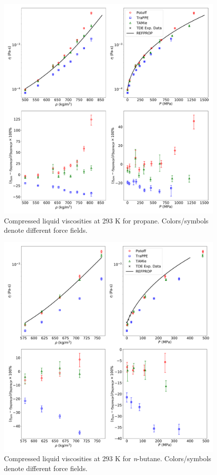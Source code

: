 \documentclass[preprint,review,12pt]{elsarticle}
\begin{document}
	\begin{figure}[htb!]
		\centering
		\includegraphics[width=6.4in]{compare_REFPROP_T293highP_C3H8_Pas.pdf}
		\caption{Compressed liquid viscosities at 293 K for propane. Colors/symbols denote different force fields.}
		\label{fig:T293highP_C3}
	\end{figure} 
	
	\begin{figure}[htb!]
		\centering
		\includegraphics[width=6.4in]{compare_REFPROP_T293highP_C4H10_Pas_new_REFPROP.pdf}
		\caption{Compressed liquid viscosities at 293 K for \textit{n}-butane. Colors/symbols denote different force fields.}
		\label{fig:T293highP_C4}
	\end{figure} 
	
\end{document}
